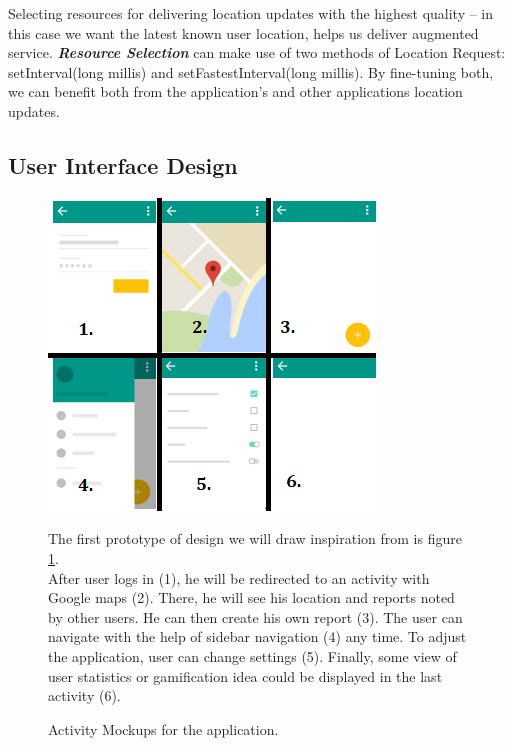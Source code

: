 Selecting resources for delivering location updates with the highest quality – in this case we want the latest known user location, helps us deliver augmented service. \textbf{\textit{Resource Selection}} can make use of two methods of Location Request: setInterval(long millis) and setFastestInterval(long millis). By fine-tuning both, we can benefit both from the application's and other applications location updates.


\subsection{User Interface Design}
\begin{figure}[H]
\begin{minipage}{.55\textwidth}
\includegraphics[width=\textwidth]{images/activityDesign}
\caption{Activity Mockups for the application.} \label{fig:activity_design}
\end{minipage}
\hfill
\begin{minipage}{.4\textwidth}
The first prototype of design we will draw inspiration from is figure \ref{fig:activity_design}.
~\\

After user logs in (1), he will be redirected to an activity with Google maps (2). There, he will see his location and reports noted by other users. He can then create his own report (3). The user can navigate with the help of sidebar navigation (4) any time. To adjust the application, user can change settings (5). Finally, some view of user statistics or gamification idea could be displayed in the last activity (6).
\end{minipage}
\end{figure}